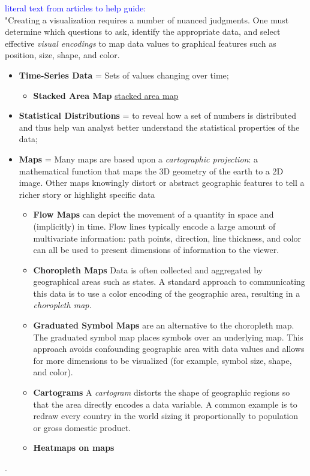 \iffalse %
\textcolor{blue}{literal text from articles to help guide: } \\
"Creating a visualization requires a number of nuanced judgments. One must determine which questions to ask, identify the appropriate data, and select effective \textit{visual encodings} to map data values to graphical features such as position, size, shape, and color.
\begin{itemize}
\item \textbf{Time-Series Data} = Sets of values changing over time;
\begin{itemize}
\item \textbf{Stacked Area Map} \href{https://datavizcatalogue.com/methods/images/top_images/stacked_area_graph.png}{stacked area map}
\end{itemize}
\item \textbf{Statistical Distributions}  = to reveal how a set of numbers is distributed and thus help van analyst better understand the statistical properties of the data;
\item \textbf{Maps} = Many maps are based upon a \textit{cartographic projection}: a mathematical function that maps the 3D geometry of the earth to a 2D image. Other maps knowingly distort or abstract geographic features to tell a richer story or highlight specific data
\begin{itemize}
\item \textbf{Flow Maps} can depict the movement of a quantity in space and (implicitly) in time. Flow lines typically encode a large amount of multivariate information: path points, direction, line thickness, and color can all be used to present dimensions of information to the viewer.
\item \textbf{Choropleth Maps} Data is often collected and aggregated by geographical areas such as states. A standard approach to communicating this data is to use a color encoding of the geographic area, resulting in a \textit{choropleth map.}
\item \textbf{Graduated Symbol Maps} are an alternative to the choropleth map. The graduated symbol map places symbols over an underlying map. This approach avoids confounding geographic area with data values and allows for more dimensions to be visualized (for example, symbol size, shape, and color).
\item \textbf{Cartograms} A \textit{cartogram} distorts the shape of geographic regions so that the area directly encodes a data variable. A common example is to redraw every country in the world sizing it proportionally to population or gross domestic product.
\item \textbf{Heatmaps on maps}
\end{itemize}
\end{itemize}
\cite{Heer2010}. \\


